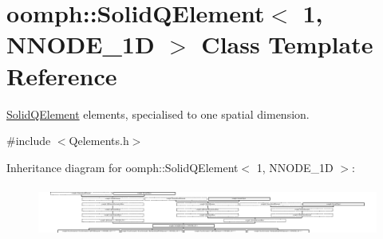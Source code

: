 \hypertarget{classoomph_1_1SolidQElement_3_011_00_01NNODE__1D_01_4}{}\section{oomph\+:\+:Solid\+Q\+Element$<$ 1, N\+N\+O\+D\+E\+\_\+1D $>$ Class Template Reference}
\label{classoomph_1_1SolidQElement_3_011_00_01NNODE__1D_01_4}


\hyperlink{classoomph_1_1SolidQElement}{Solid\+Q\+Element} elements, specialised to one spatial dimension.  




{\ttfamily \#include $<$Qelements.\+h$>$}

Inheritance diagram for oomph\+:\+:Solid\+Q\+Element$<$ 1, N\+N\+O\+D\+E\+\_\+1D $>$\+:\begin{figure}[H]
\begin{center}
\leavevmode
\includegraphics[height=1.706667cm]{classoomph_1_1SolidQElement_3_011_00_01NNODE__1D_01_4}
\end{center}
\end{figure}
